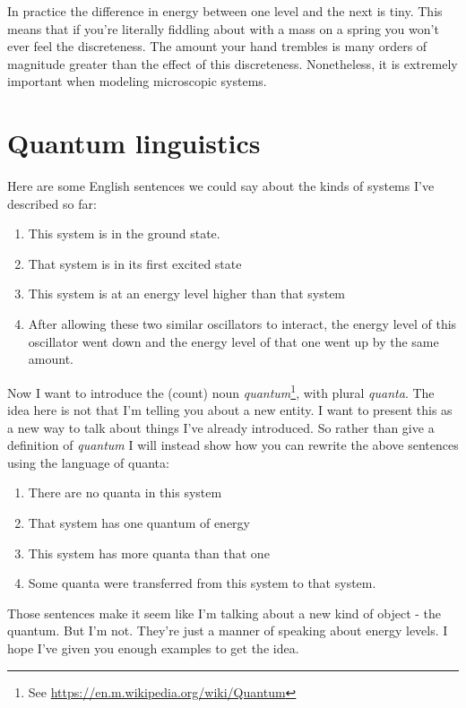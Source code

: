 \documentclass[a4paper]{article}
\begin{document}
In practice the difference in energy between one level and the next is tiny. This means that if you're literally fiddling about with a mass on a spring you won't ever feel the discreteness. The amount your hand trembles is many orders of magnitude greater than the effect of this discreteness. Nonetheless, it is extremely important when modeling microscopic systems.

\section{Quantum linguistics}

Here are some English sentences we could say about the kinds of systems I've described so far:

\begin{enumerate}
\item This system is in the ground state.
\item That system is in its first excited state
\item This system is at an energy level higher than that system
\item After allowing these two similar oscillators to interact, the energy level of this oscillator went down and the energy level of that one went up by the same amount.
\end{enumerate}

Now I want to introduce the (count) noun {\em quantum}\footnote{See \url{https://en.m.wikipedia.org/wiki/Quantum}}, with plural {\em quanta}.
The idea here is not that I'm telling you about a new entity.
I want to present this as a new way to talk about things I've already introduced.
So rather than give a definition of {\em quantum} I will instead show how you can rewrite the above sentences using the language of quanta:

\begin{enumerate}
\item There are no quanta in this system
\item That system has one quantum of energy
\item This system has more quanta than that one
\item Some quanta were transferred from this system to that system.
\end{enumerate}

Those sentences make it seem like I'm talking about a new kind of object - the quantum.
But I'm not.
They're just a manner of speaking about energy levels.
I hope I've given you enough examples to get the idea.
\end{document}

